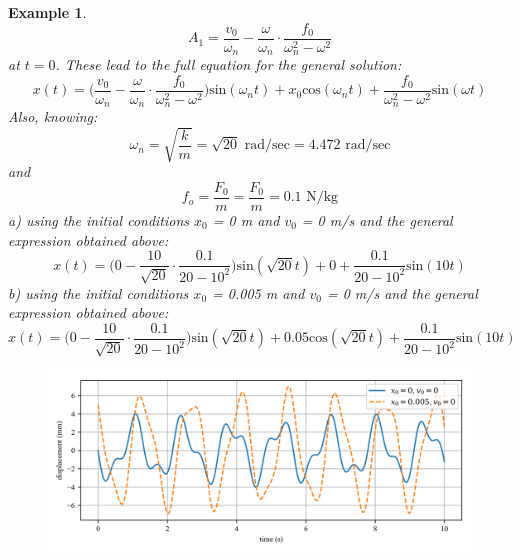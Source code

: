 \documentclass[12pt,letter]{article}
\newtheorem{ex}{Example}
\numberwithin{ex}{section} %
\newenvironment{example}{\begin{mdframed}[middlelinewidth=0.5mm]\begin{ex}\normalfont}{\end{ex}\end{mdframed}}
\numberwithin{re}{section} %
\begin{document}
\begin{example}
\begin{equation}
				A_1 = \frac{v_0}{\omega_n}-\frac{\omega}{\omega_n}\cdot \frac{f_0}{\omega_n^2-\omega^2}
			\end{equation}	
			at $t=0$. These lead to the full equation for the general solution:
			\begin{equation}
				x(t) = \Big(\frac{v_0}{\omega_n}-\frac{\omega}{\omega_n}\cdot \frac{f_0}{\omega_n^2-\omega^2}\Big)\text{sin}(\omega_n t) + x_0\text{cos}(\omega_n t) + \frac{f_0}{\omega_n^2-\omega^2}\text{sin}(\omega t)
			\end{equation}								
			Also, knowing:
			\begin{equation}
				\omega_n = \sqrt{\frac{k}{m}} = \sqrt{20} \text{ rad/sec} =  4.472 \text{ rad/sec}
			\end{equation}				
			and
			\begin{equation}
				f_o = \frac{F_0}{m} = \frac{F_0}{m} = 0.1 \text{ N/kg}
			\end{equation}	
			a) using the initial conditions $x_0$ = 0 m and $v_0$ = 0 m/s and the general expression obtained above:
			\begin{equation}
				x(t) = \Big(0-\frac{10}{\sqrt{20}}\cdot \frac{0.1}{20-10^2}\Big)\text{sin}(\sqrt{20} t) + 0 + \frac{0.1}{20-10^2}\text{sin}(10 t)
			\end{equation}			
			b) using the initial conditions $x_0$ = 0.005 m and $v_0$ = 0 m/s and the general expression obtained above:
			\begin{equation}
				x(t) = \Big(0-\frac{10}{\sqrt{20}}\cdot \frac{0.1}{20-10^2}\Big)\text{sin}(\sqrt{20} t) + 0.05\text{cos}(\sqrt{20} t) + \frac{0.1}{20-10^2}\text{sin}(10 t)
			\end{equation}			
			\begin{figure}[H]
				\centering
				\includegraphics[width=1.0\textwidth]{../Figures/topic_6_example_2.png}
			\end{figure}
\end{example}
\end{document}
